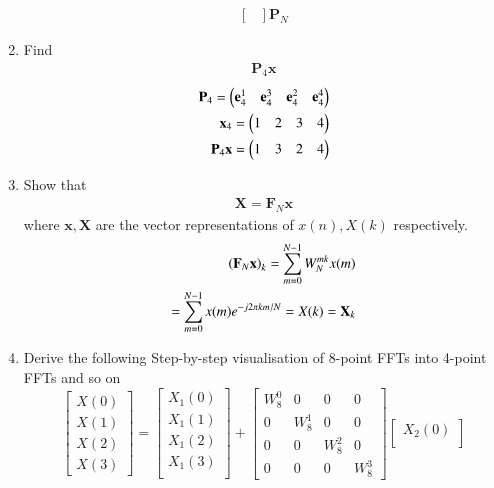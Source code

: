 \documentclass[journal,12pt,twocolumn]{IEEEtran}
\let\vec\mathbf
\renewcommand\thesection{\arabic{section}}
\begin{document}
\begin{enumerate}[label=\arabic*.,ref=\thesection.\theenumi]
\begin{align}
\begin{bmatrix}
	\end{bmatrix}
	\vec{P}_{N}
\end{align}
\item Find 
\begin{align}
	\vec{P}_4 \vec{x}
\end{align}
\solution
\begin{align}
	\vec{P}_{4} = \myvec{\vec{e}_4^{1} &\vec{e}_4^{3} &\vec{e}_4^{2}	&\vec{e}_4^{4}}\\
	\vec{x}_4 = \myvec{1 & 2 & 3 & 4}\\%
	\vec{P}_{4}	\vec{x} = \myvec{1 & 3 & 2 & 4}
\end{align}
\item Show that 
\begin{align}
	\vec{X} = \vec{F}_N \vec{x}
	\label{eq:dft-mat-def}
\end{align}
where $\vec{x}, \vec{X}$ are the vector representations of $x(n), X(k)$ respectively.\\
\solution
\begin{align}
	\brak{\vec{F}_{N}\vec{x}}_{k} = \sum_{m=0}^{N-1}W_{N}^{mk}x(m)\\
	= \sum_{m=0}^{N-1} x(m) e^{-j 2 \pi k m / N}
	= X(k) = \vec{X}_{k} 
\end{align}
\item Derive the following Step-by-step visualisation  of
8-point FFTs into 4-point FFTs and so on
\begin{equation}
	\begin{bmatrix}
		X(0) \\ 
		X(1) \\ 
		X(2) \\ 
		X(3)
	\end{bmatrix}
	=
	\begin{bmatrix}
		X_{1}(0) \\ 
		X_{1}(1)\\ 
		X_{1}(2)\\
		X_{1}(3)\\
	\end{bmatrix}
	+
	\begin{bmatrix}
		W^{0}_{8} & 0 & 0 & 0\\
		0 & W^{1}_{8} & 0 & 0\\
		0 & 0 & W^{2}_{8} & 0\\
		0 & 0 & 0 & W^{3}_{8}
	\end{bmatrix}
	\begin{bmatrix}
		X_{2}(0) \\ 

\end{bmatrix}
\end{equation}
\end{enumerate}
\end{document}
